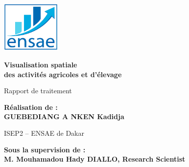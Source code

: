 \begin{titlepage}

\begin{center}
\begin{minipage}[c][0.95\textheight][c]{0.98\textwidth}
  \centering

  \includegraphics[width=0.22\textwidth]{logo_ENSAE.png} \\
  \vspace{1.8cm}

  {\Huge \bfseries Visualisation spatiale \\[0.3cm] des activités agricoles et d'élevage\par}
  \vspace{1.8cm}

  {\Large Rapport de traitement \par}
  \vspace{2.5cm}

  {\LARGE \textbf{Réalisation de :}\\[0.3cm] \textbf{GUEBEDIANG A NKEN Kadidja} \par}
  \vspace{1.2cm}

  {\Large ISEP2 – ENSAE de Dakar \par}
  \vspace{1.2cm}

  {\LARGE \textbf{Sous la supervision de :}\\[0.3cm] \textbf{M. Mouhamadou Hady DIALLO, Research Scientist} \par}
  \vspace{1.2cm}

\end{minipage}
\end{center}

\end{titlepage}
